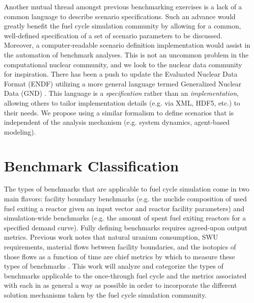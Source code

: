 \documentclass{anstrans}
\begin{document}
Another mutual thread amongst previous benchmarking exercises is a
lack of a common language to describe scenario specifications. Such an
advance would greatly benefit the fuel cycle simulation community by
allowing for a common, well-defined specification of a set of scenario
parameters to be discussed. Moreover, a computer-readable scenario
definition implementation would assist in the automation of benchmark
analyses. This is not an uncommon problem in the computational nuclear
community, and we look to the nuclear data community for
inspiration. There has been a push to update the Evaluated Nuclear
Data Format (ENDF) utilizing a more general language termed
Generalized Nuclear Data (GND) \cite{mattoon_generalized_2012}. This
language is a \emph{specification} rather than an
\emph{implementation}, allowing others to tailor implementation
details (e.g. via XML, HDF5, etc.) to their needs. We propose using a
similar formalism to define scenarios that is independent of the
analysis mechanism (e.g. system dynamics, agent-based modeling).

\section{Benchmark Classification}
The types of benchmarks that are applicable to fuel cycle simulation
come in two main flavors: facility boundary benchmarks (e.g. the
nuclide composition of used fuel exiting a reactor given an input vector
and reactor facility parameters) and simulation-wide benchmarks (e.g. the
amount of spent fuel exiting reactors for a specified demand curve).
Fully defining benchmarks requires agreed-upon output metrics.
Previous work notes that natural uranium consumption, SWU 
requirements, material flows between facility boundaries, and the 
isotopics of those flows as a function of time are chief metrics by
which to measure these types of benchmarks 
\cite{boucher_specification_2008}. This work will analyze and 
categorize the types of benchmarks applicable to the once-through 
fuel cycle and the metrics associated with each in as general a way
as possible in order to incorporate the different solution mechanisms
taken by the fuel cycle simulation community.

\end{document}
